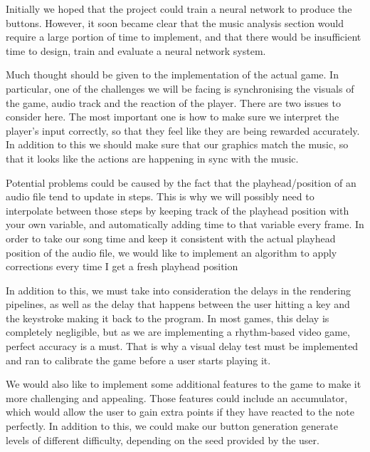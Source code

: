 Initially we hoped that the project could train a neural network to produce the buttons. However, it soon became clear that the music analysis section would require a large portion of time to implement, and that there would be insufficient time to design, train and evaluate a neural network system.

Much thought should be given to the implementation of the actual game. In particular, one of the challenges we will be facing is synchronising the visuals of the game, audio track and the reaction of the player. There are two issues to consider here. The most important one is how to make sure we interpret the player's input correctly, so that they feel like they are being rewarded accurately. In addition to this we should make sure that our graphics match the music, so that it looks like the actions are happening in sync with the music.

Potential problems could be caused by the fact that the playhead/position of an audio file tend to update in steps. This is why we will possibly need to interpolate between those steps by keeping track of the playhead position with your own variable, and automatically adding time to that variable every frame. 
In order to take our song time and keep it consistent with the actual playhead position of the audio file, we would like to implement an algorithm to apply corrections every time I get a fresh playhead position

In addition to this, we must take into consideration the delays in the rendering pipelines, as well as the delay that happens between the user hitting a key and the keystroke making it back to the program. In most games, this delay is completely negligible, but as we are implementing a rhythm-based video game, perfect accuracy is a must. That is why a visual delay test must be implemented and ran to calibrate the game before a user starts playing it.

We would also like to implement some additional features to the game to make it more challenging and appealing. Those features could include an accumulator, which would allow the user to gain extra points if they have reacted to the note perfectly. In addition to this, we could make our button generation generate levels of different difficulty, depending on the seed provided by the user. 


